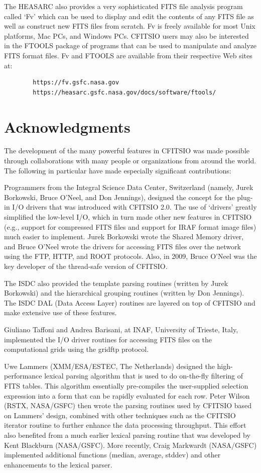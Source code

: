 \documentclass[11pt]{book}
\begin{document}
The HEASARC also provides a very sophisticated FITS file analysis
program called `Fv' which can be used to display and edit the contents
of any FITS file as well as construct new FITS files from scratch.
Fv is freely available for
most Unix platforms, Mac PCs, and Windows PCs.
CFITSIO users may also be interested in the FTOOLS package of programs
that can be used to manipulate and analyze FITS format files.
Fv and FTOOLS are available from their respective Web sites at:

\begin{verbatim}
        https://fv.gsfc.nasa.gov
        https://heasarc.gsfc.nasa.gov/docs/software/ftools/
\end{verbatim}


\section{Acknowledgments}

The development of the many powerful features in CFITSIO was made
possible through collaborations with many people or organizations from
around the world.  The following in particular have made especially
significant contributions:

Programmers from the Integral Science Data Center, Switzerland (namely,
Jurek Borkowski, Bruce O'Neel, and Don Jennings), designed the concept
for the plug-in I/O drivers that was introduced with CFITSIO 2.0.  The
use of `drivers' greatly simplified  the low-level I/O, which in turn
made other new features in CFITSIO (e.g., support for compressed FITS
files and support for IRAF format image files) much easier to
implement.  Jurek Borkowski wrote the Shared Memory driver, and Bruce
O'Neel wrote the drivers for accessing FITS files over the network
using the FTP, HTTP, and ROOT protocols.  Also, in 2009, Bruce O'Neel
was the key developer of the thread-safe version of CFITSIO.

The ISDC also provided the template parsing routines (written by Jurek
Borkowski) and the hierarchical grouping routines (written by Don
Jennings).  The ISDC DAL (Data Access Layer) routines are layered on
top of CFITSIO and make extensive use of these features.

Giuliano Taffoni and Andrea Barisani, at INAF, University of Trieste,
Italy, implemented the I/O driver routines for accessing FITS files
on the computational grids using the gridftp protocol.

Uwe Lammers (XMM/ESA/ESTEC, The Netherlands) designed the
high-performance lexical parsing algorithm that is used to do
on-the-fly filtering of FITS tables.  This algorithm essentially
pre-compiles the user-supplied selection expression into a form that
can be rapidly evaluated for each row.  Peter Wilson (RSTX, NASA/GSFC)
then wrote the parsing routines used by CFITSIO based on Lammers'
design, combined with other techniques such as the CFITSIO iterator
routine to further enhance the data processing throughput.  This effort
also benefited from a much earlier lexical parsing routine that was
developed by Kent Blackburn (NASA/GSFC). More recently, Craig Markwardt
(NASA/GSFC) implemented additional functions (median, average, stddev)
and other enhancements to the lexical parser.
\end{document}
